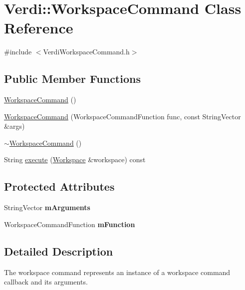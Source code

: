 \hypertarget{class_verdi_1_1_workspace_command}{\section{\-Verdi\-:\-:\-Workspace\-Command \-Class \-Reference}
\label{class_verdi_1_1_workspace_command}
}


{\ttfamily \#include $<$\-Verdi\-Workspace\-Command.\-h$>$}

\subsection*{\-Public \-Member \-Functions}
\begin{DoxyCompactItemize}
\item 
\hyperlink{class_verdi_1_1_workspace_command_a3745be60bb6d0fc0865b8cf4e6444572}{\-Workspace\-Command} ()
\item 
\hyperlink{class_verdi_1_1_workspace_command_ad17571efa82b23ed65480d01908f1354}{\-Workspace\-Command} (\-Workspace\-Command\-Function func, const \-String\-Vector \&args)
\item 
\hyperlink{class_verdi_1_1_workspace_command_a8138ec72e17a4db2989934a77ba65faa}{$\sim$\-Workspace\-Command} ()
\item 
\-String \hyperlink{class_verdi_1_1_workspace_command_a976a836f4488688e59a5aaaf3cc6e444}{execute} (\hyperlink{class_verdi_1_1_workspace}{\-Workspace} \&workspace) const 
\end{DoxyCompactItemize}
\subsection*{\-Protected \-Attributes}
\begin{DoxyCompactItemize}
\item 
\hypertarget{class_verdi_1_1_workspace_command_afa2051d5c645b8e59641a976e391f53d}{\-String\-Vector {\bfseries m\-Arguments}}\label{class_verdi_1_1_workspace_command_afa2051d5c645b8e59641a976e391f53d}

\item 
\hypertarget{class_verdi_1_1_workspace_command_a82494af99acdc475a099eeaf061e1896}{\-Workspace\-Command\-Function {\bfseries m\-Function}}\label{class_verdi_1_1_workspace_command_a82494af99acdc475a099eeaf061e1896}

\end{DoxyCompactItemize}


\subsection{\-Detailed \-Description}
\-The workspace command represents an instance of a workspace command callback and its arguments. 

